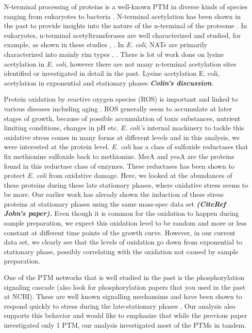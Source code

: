 \documentclass[12pt]{article}
\begin{document}
N-terminal processing of proteins is a well-known PTM in diverse kinds of species ranging from eukaryotes to bacteria \cite{Kimuraetal2003}. N-terminal acetylation has been shown in the past to provide insights into the nature of the n-terminal of the proteome \cite{Helbigetal2010}. In eukaryotes, n-terminal acetyltransferases are well characterized and studied, for example, as shown in these studies \cite{PolevodaSherman2003}, \cite{PolevodaSherman2003b}. In \emph{E. coli}, NATs are primarily characterized into mainly rim types \cite{Tanakaetal1989}, \cite{Yoshikawaetal1987}. There is lot of work done on lysine acetylation in \emph{E. coli}, however there are not many n-terminal acetylation sites identified or investigated in detail in the past. Lysine acetylation E. coli, acetylation in exponential and stationary phases \textbf{\emph{Colin's discussion}}. 

Protein oxidation by reactive oxygen species (ROS) is important and linked to various diseases including aging \cite{Stadtman1992}. ROS generally seem to accumulate at later stages of growth, because of possible accumulation of toxic substances, nutrient limiting conditions, changes in pH etc. \emph{E. coli's} internal machinery to tackle this oxidative stress comes in many forms at different levels and in this analysis, we were interested at the protein level. \emph{E. coli} has a class of sulfoxide reductases \cite{Brotetal1981} \cite{ZhangWeissbach2008} that fix methionine sulfoxide back to methionine. MsrA and yeaA are the proteins found in this reductase class of enzymes. These reductases has been shown to protect \emph{E. coli} from oxidative damage\cite{Ezratyetal2004}. Here, we looked at the abundances of these proteins during these late stationary phases, where oxidative stress seems to be more. Our earlier work has already shown the induction of these stress proteins at stationary phases using the same mass-spec data set \textbf{\emph{(CiteRef John's paper).}} Even though it is common for the oxidation to happen during sample preparation, we expect this oxidation level to be random and more or less constant at different time points of the growth curve. However, in our current data set, we clearly see that the levels of oxidation go down from exponential to stationary phase, possibly correlating with the oxidation not caused by sample preparation.

One of the PTM networks that is well studied in the past is the phosphorylation signaling cascade\cite{Olsenetal2006} (also look for phosphorylation papers that you used in the past at NCBI). These are well known signalling mechansims and have been shown to respond quickly to stress during the late-stationary phases \cite{Soaresetal2013}. Our analysis also supports this behavior and would like to emphasize that while the previous paper investigated only 1 PTM, our analysis investigated most of the PTMs in tandem. 
\end{document}
